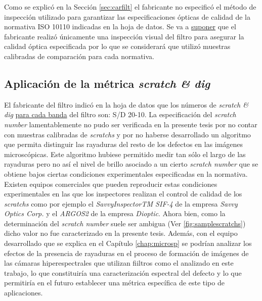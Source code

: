 Como se explicó en la Sección \ref{sec:carfilt} el fabricante no especificó el método de inspección utilizado para garantizar las especificaciones ópticas de calidad de la normativa ISO 10110 indicadas en la hoja de datos. Se va a \underline{suponer} que el fabricante realizó únicamente una inspección visual del filtro para asegurar la calidad óptica especificada por lo que se considerará que utilizó muestras calibradas de comparación para cada normativa.

\singlespacing
\subsection{Aplicación de la métrica \textit{scratch \& dig}}
\label{sec:sctdig}

\hspace{0.5cm}El fabricante del filtro indicó en la hoja de datos que los números de \textit{scratch \& dig} \underline{para cada banda} del filtro son: S/D 20-10. La especificación del \textit{scratch number} lamentablemente no pudo ser verificada en la presente tesis por no contar con muestras calibradas de \textit{scratchs} y por no haberse desarrollado un algoritmo que permita distinguir las rayaduras del resto de los defectos en las imágenes microscópicas. Este algoritmo hubiese permitido medir tan sólo el largo de las rayaduras pero no así el nivel de brillo asociado a un cierto \textit{scratch number} que se obtiene bajos ciertas condiciones experimentales especificadas en la normativa. Existen equipos comerciales que pueden reproducir estas condiciones experimentales en las que los inspectores realizan el control de calidad de los \textit{scratchs} como por ejemplo el \textit{SavvyInspectorTM SIF-4} de la empresa \textit{Savvy Optics Corp.} y el \textit{ARGOS2} de la empresa \textit{Dioptic}. Ahora bien, como la determinación del \textit{scratch number} suele ser ambigua (Ver \ref{fig:samplescratchs}) dicho valor no fue caracterizado en la presente tesis. Además, con el equipo desarrollado que se explica en el Capítulo \ref{chap:microsp} se podrían analizar los efectos de la presencia de rayaduras en el proceso de formación de imágenes de las cámaras hiperespectrales que utilizan fiiltros como el analizado en este trabajo, lo que constituiría una caracterización espectral del defecto y lo que permitiría en el futuro establecer una métrica específica de este tipo de aplicaciones.


